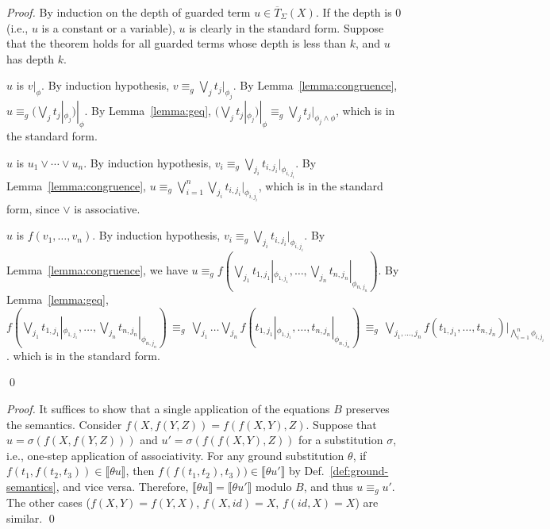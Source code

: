 \standard*
\begin{proof}
By induction on the depth of guarded term $u\in \overline{T}_{\Sigma}(X)$.
If the depth is $0$ (i.e., $u$ is a constant or a variable), $u$ is clearly in the standard form. 
%
Suppose that the theorem holds for all guarded terms whose depth is less than $k$,
and $u$ has depth $k$. %
%
\begin{inparaenum}[(1)]	
	\item $u$ is $v |_\phi$. By induction hypothesis, $v \equiv_g \bigvee_{j} t_{j} |_{\phi_{j}}$.
	By Lemma~\ref{lemma:congruence}, $u \equiv_g (\bigvee_{j} t_{j} |_{\phi_{j}}) |_\phi$.
	By Lemma~\ref{lemma:geq}, $(\bigvee_{j} t_{j} |_{\phi_{j}}) |_\phi \equiv_g \bigvee_{j} t_{j} |_{\phi_{j} \wedge \phi}$,
	which is in the standard form.
	\item $u$ is $u_1 \vee \cdots \vee u_n$.
	By induction hypothesis, $v_i \equiv_g \bigvee_{j_i} t_{i,j_i} |_{\phi_{i,j_i}}$.
	By Lemma~\ref{lemma:congruence}, $u \equiv_g \bigvee_{i=1}^n \bigvee_{j_i} t_{i,j_i} |_{\phi_{i,j_i}}$,
	which is in the standard form, since $\vee$ is associative. 
	\item $u$ is $f(v_1, \ldots, v_n)$.
	By induction hypothesis, $v_i \equiv_g \bigvee_{j_i} t_{i,j_i} |_{\phi_{i,j_i}}$.
	By Lemma~\ref{lemma:congruence},
	we have $u \equiv_g f(\bigvee_{j_1} t_{1,j_1} |_{\phi_{1,j_1}}, \ldots, \bigvee_{j_n} t_{n,j_n} |_{\phi_{n,j_n}})$.
	By Lemma~\ref{lemma:geq},
	$f(\bigvee_{j_1} t_{1,j_1} |_{\phi_{1,j_1}}, \ldots, \bigvee_{j_n} t_{n,j_n} |_{\phi_{n,j_n}})
	\,\equiv_g\,
	\bigvee_{j_1} \ldots \bigvee_{j_n} f( t_{1,j_1} |_{\phi_{1,j_1}}, \ldots,  t_{n,j_n} |_{\phi_{n,j_n}}) \allowbreak
	\,\equiv_g\,
	\bigvee_{j_1,\ldots,j_n} f( t_{1,j_1} , \ldots,  t_{n,j_n} )|_{\bigwedge_{i=1}^n \phi_{i,j_i}}$.
	which is in the standard form.
\end{inparaenum}
\qed
\end{proof}


\aciguard*
\begin{proof}
It suffices to show that a single application of the equations $B$ preserves the semantics.
Consider $f(X, f(Y,Z)) = f(f(X,Y),Z)$. Suppose that
$u = \sigma (f(X, f(Y,Z)))$ and $u' = \sigma (f(f(X,Y),Z))$
for a substitution $\sigma$,
i.e., one-step application of associativity. 
%
For any ground substitution $\theta$,
if $f(t_1, f(t_2,t_3)) \in \llbracket \theta u \rrbracket$,
then $f(f(t_1, t_2),t_3)) \in \llbracket \theta u' \rrbracket$
by Def.~\ref{def:ground-semantics}, and vice versa.
%
Therefore, $\llbracket \theta u \rrbracket = \llbracket \theta u' \rrbracket$ modulo $B$, and thus $u \equiv_g u'$.
The other cases ($f(X, Y) = f(Y, X)$, $f(X, \mathit{id}) = X$, $f(\mathit{id}, X) = X$) are similar. 
\qed
\end{proof}


